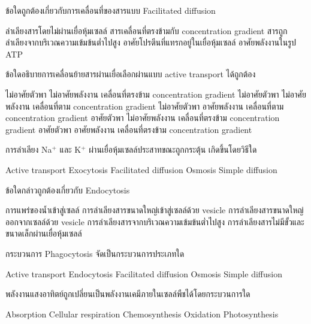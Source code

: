 \documentclass[12pt, a4paper]{exam}
\begin{document}
\begin{questions}
\filbreak
  \question ข้อใดถูกต้องเกี่ยวกับการเคลื่อนที่ของสารแบบ Facilitated diffusion
  \begin{choices}
    \choice ลำเลียงสารโดยไม่ผ่านเยื่อหุ้มเซลล์
    \choice สารเคลื่อนที่ตรงข้ามกับ concentration gradient
    \choice สารถูกลำเลียงจากบริเวณความเข้มข้นต่ำไปสูง
    \choice อาศัยโปรตีนที่แทรกอยู่ในเยื่อหุ้มเซลล์
    \choice อาศัยพลังงานในรูป ATP
\end{choices}

\filbreak
  \question ข้อใดอธิบายการเคลื่อนย้ายสารผ่านเยื่อเลือกผ่านแบบ active transport ได้ถูกต้อง
  \begin{choices}
    \choice ไม่อาศัยตัวพา ไม่อาศัยพลังงาน เคลื่อนที่ตรงข้าม concentration gradient
    \choice ไม่อาศัยตัวพา ไม่อาศัยพลังงาน เคลื่อนที่ตาม concentration gradient
    \choice ไม่อาศัยตัวพา อาศัยพลังงาน เคลื่อนที่ตาม concentration gradient
    \choice อาศัยตัวพา ไม่อาศัยพลังงาน เคลื่อนที่ตรงข้าม concentration gradient
    \choice อาศัยตัวพา อาศัยพลังงาน เคลื่อนที่ตรงข้าม concentration gradient
\end{choices}

\filbreak
  \question การลำเลียง Na$^+$ และ K$^+$ ผ่านเยื่อหุ้มเซลล์ประสาทขณะถูกกระตุ้น เกิดขึ้นโดยวิธีใด
  \begin{choices}
    \choice Active transport
    \choice Exocytosis
    \choice Facilitated diffusion
    \choice Osmosis
    \choice Simple diffusion
\end{choices}

\filbreak
  \question ข้อใดกล่าวถูกต้องเกี่ยวกับ Endocytosis
  \begin{choices}
    \choice การแพร่ของน้ำเข้าสู่เซลล์
    \choice การลำเลียงสารขนาดใหญ่เข้าสู่เซลล์ด้วย vesicle
    \choice การลำเลียงสารขนาดใหญ่ออกจากเซลล์ด้วย vesicle
    \choice การลำเลียงสารจากบริเวณความเข้มข้นต่ำไปสูง
    \choice การลำเลียงสารไม่มีขั้วและขนาดเล็กผ่านเยื่อหุ้มเซลล์
\end{choices}

\filbreak
  \question กระบวนการ Phagocytosis จัดเป็นกระบวนการประเภทใด
  \begin{choices}
    \choice Active transport
    \choice Endocytosis
    \choice Facilitated diffusion
    \choice Osmosis
    \choice Simple diffusion
\end{choices}

\filbreak
  \question พลังงานแสงอาทิตย์ถูกเปลี่ยนเป็นพลังงานเคมีภายในเซลล์พืชได้โดยกระบวนการใด
  \begin{choices}
    \choice Absorption
    \choice Cellular respiration
    \choice Chemosynthesis
    \choice Oxidation
    \choice Photosynthesis
\end{choices}


\end{questions}
\end{document}
